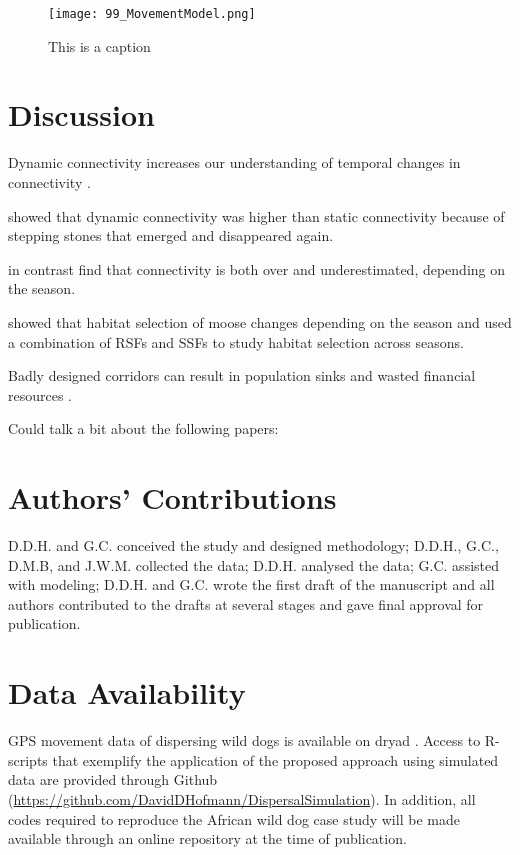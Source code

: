 \documentclass[abstract=on,10pt,a4paper,bibliography=totocnumbered]{article}
\newcommand{\inputy}[1]{\unskip}
\begin{document}
\begin{figure}
 \begin{center}
  \texttt{[image: 99\_MovementModel.png]}
  \caption{This is a caption}
  \label{Movement Model}
 \end{center}
\end{figure}

\inputy{99_MovementModel.tex}

\section{Discussion}
Dynamic connectivity increases our understanding of temporal changes in
connectivity \citep{Martensen.2017}.

\cite{Martensen.2017} showed that dynamic connectivity was higher than static
connectivity because of stepping stones that emerged and disappeared again.

\cite{Osipova.2019} in contrast find that connectivity is both over and
underestimated, depending on the season.

\cite{Benz.2016} showed that habitat selection of moose changes depending on the
season and used a combination of RSFs and SSFs to study habitat selection across
seasons.

Badly designed corridors can result in population sinks and wasted financial
resources \citep{Simberloff.1992}.

Could talk a bit about the following papers: \citep{Chetkiewicz.2009, Benz.2016,
Mui.2017, Osipova.2019, Kaszta.2021}

\section{Authors' Contributions}
D.D.H. and G.C. conceived the study and designed methodology; D.D.H., G.C.,
D.M.B, and J.W.M. collected the data; D.D.H. analysed the data; G.C. assisted
with modeling; D.D.H. and G.C. wrote the first draft of the manuscript and all
authors contributed to the drafts at several stages and gave final approval for
publication.

\section{Data Availability}
GPS movement data of dispersing wild dogs is available on dryad
\citep{Hofmann.2021a}. Access to R-scripts that exemplify the application of the
proposed approach using simulated data are provided through Github
(\url{https://github.com/DavidDHofmann/DispersalSimulation}). In addition, all
codes required to reproduce the African wild dog case study will be made
available through an online repository at the time of publication.
\end{document}
